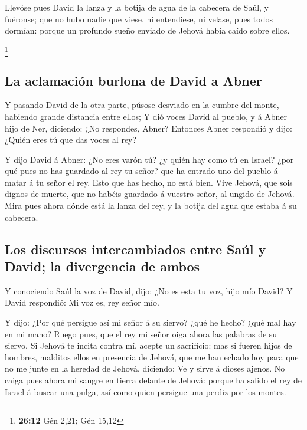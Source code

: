  Llevóse pues David la lanza y la botija de agua de la
cabecera de Saúl, y fuéronse; que no hubo nadie que viese, ni
entendiese, ni velase, pues todos dormían: porque un profundo sueño
enviado de Jehová había caído sobre ellos.

\footnote{\textbf{26:12} Gén 2,21; Gén 15,12}

\hypertarget{la-aclamaciuxf3n-burlona-de-david-a-abner}{%
\subsection{La aclamación burlona de David a
Abner}\label{la-aclamaciuxf3n-burlona-de-david-a-abner}}

 Y pasando David de la otra parte, púsose desviado en la
cumbre del monte, habiendo grande distancia entre ellos;  Y
dió voces David al pueblo, y á Abner hijo de Ner, diciendo: ¿No
respondes, Abner? Entonces Abner respondió y dijo: ¿Quién eres tú que
das voces al rey?

 Y dijo David á Abner: ¿No eres varón tú? ¿y quién hay como
tú en Israel? ¿por qué pues no has guardado al rey tu señor? que ha
entrado uno del pueblo á matar á tu señor el rey.  Esto que
has hecho, no está bien. Vive Jehová, que sois dignos de muerte, que no
habéis guardado á vuestro señor, al ungido de Jehová. Mira pues ahora
dónde está la lanza del rey, y la botija del agua que estaba á su
cabecera.

\hypertarget{los-discursos-intercambiados-entre-sauxfal-y-david-la-divergencia-de-ambos}{%
\subsection{Los discursos intercambiados entre Saúl y David; la
divergencia de
ambos}\label{los-discursos-intercambiados-entre-sauxfal-y-david-la-divergencia-de-ambos}}

 Y conociendo Saúl la voz de David, dijo: ¿No es esta tu
voz, hijo mío David? Y David respondió: Mi voz es, rey señor mío.

 Y dijo: ¿Por qué persigue así mi señor á su siervo? ¿qué
he hecho? ¿qué mal hay en mi mano?  Ruego pues, que el rey
mi señor oiga ahora las palabras de su siervo. Si Jehová te incita
contra mí, acepte un sacrificio: mas si fueren hijos de hombres,
malditos ellos en presencia de Jehová, que me han echado hoy para que no
me junte en la heredad de Jehová, diciendo: Ve y sirve á dioses ajenos.
 No caiga pues ahora mi sangre en tierra delante de Jehová:
porque ha salido el rey de Israel á buscar una pulga, así como quien
persigue una perdiz por los montes.

